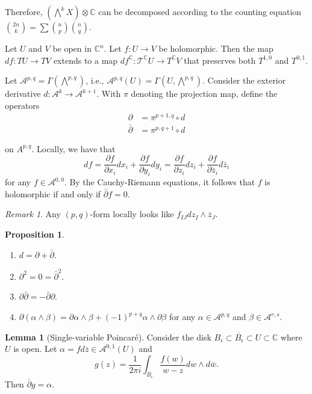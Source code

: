 \documentclass[10pt,letterpaper,cm]{nupset}
\theoremstyle{definition}
\theoremstyle{theorem}
\newtheorem{lemma}[defn]{Lemma}
\newtheorem{prop}[defn]{Proposition}
\theoremstyle{remark}
\newtheorem{remark}[defn]{Remark}
\newcommand{\A}{\mathcal A}
\newcommand{\C}{\mathbb C}
\newcommand{\T}{\mathcal T}
\newcommand{\1}{\mathbb{1}}
\newcommand{\0}{\vec 0}
\newcommand{\be}{\begin{enumerate}}
\newcommand{\ee}{\end{enumerate}}
\begin{document}
Therefore,  $\left(\bigwedge^k{X}\right) \otimes \C$ can be decomposed according to the counting equation ${2n \choose k} = \sum{{n\choose p}{n\choose q}}$.

\medskip

Let $U$ and $V$ be open  in $\C^n$. Let $f: U \to V$ be holomorphic. Then the map $d{f} : T{U} \to T{V}$ extends to a map $d{f}^{\C} : \T^{\C}{U} \to T^{\C}{V}$ that preserves both $T^{1,0}$ and $T^{0,1}$. 

\medskip

Let $\A^{p,q}  = \Gamma\left(\bigwedge^{p,q}\right)$, i.e., $\A^{p,q}\left(U\right) = \Gamma\left(U, \bigwedge^{p,q}\right)$. Consider the exterior derivative $d: \A^k \to \A^{k+1}$. With $\pi$ denoting the projection map, define the operators
\begin{align*}
\partial & = \pi^{p+1, q} \circ d
\\ \bar{\partial}  & = \pi^{p, q+1} \circ d
\end{align*}

on $A^{p,q}$. Locally, we have that $$df = \frac{\partial{f}}{\partial{x_i}}d{x_i} + \frac{\partial{f}}{\partial{y_i}}d{y_i} = \frac{\partial{f}}{\partial{z_i}}d{z_i} + \frac{\partial{f}}{\partial{\bar{z}_i}}d{\bar{z}_i} $$ for any $f\in \A^{0,0}$.  By the Cauchy-Riemann equations, it follows that $f$ is holomorphic if and only if $\bar{\partial}{f} = 0$.

\begin{remark}
Any $\left(p,q\right)$-form locally looks like $f_{IJ}d{z_I}\wedge \bar{z}_J$.
\end{remark}

\begin{prop} $ $
\be
\item $d = \partial + \bar{\partial}$.
\item $\partial^2 =0 = \bar{\partial}^2$. 
\item $\partial{\bar{\partial}} = {-\bar{\partial}{\partial}}$.
\item $\partial\left(\alpha \wedge \beta\right) = \partial{\alpha} \wedge \beta + \left({-1}\right)^{p+q} \alpha \wedge \partial{\beta}$ for any $\alpha \in \A^{p,q}$ and $\beta \in \A^{r,s}$.
\ee
\end{prop}

\begin{lemma}[Single-variable Poincar\'e]
Consider the disk $B_{\epsilon} \subset \overline{B_{\epsilon}} \subset U \subset \C$ where $U$ is open.  Let $\alpha = f{d{\bar{z}}} \in \A^{0,1}\left(U\right)$ and $$ g(z) = \frac{1}{2\pi i}\int_{\overline{B_{\epsilon}}}\frac{f(w)}{w-z}{d{w} \wedge d{\bar{w}}}.$$ Then $\bar{\partial}{g} = \alpha$. 
\end{lemma}
\end{document}

